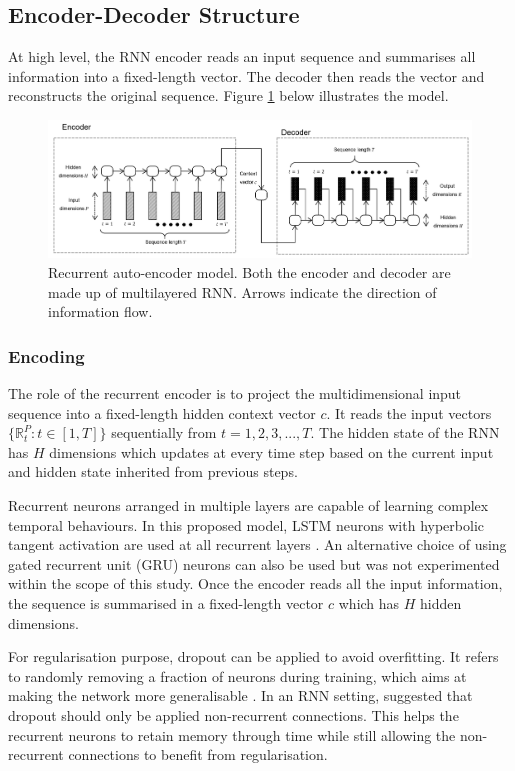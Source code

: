 \documentclass[runningheads]{llncs}
\begin{document}
\subsection{Encoder-Decoder Structure} 
At high level, the RNN encoder reads an input sequence and summarises all information into a fixed-length vector. The decoder then reads the vector and reconstructs the original sequence. Figure \ref{fig:seq2seq} below illustrates the model.

\begin{figure}[H]
	\centering
	\includegraphics[width=1\textwidth]{seq2seq.png}
	\caption{Recurrent auto-encoder model. Both the encoder and decoder are made up of multilayered RNN. Arrows indicate the direction of information flow.}
	\label{fig:seq2seq}
\end{figure}

\subsubsection{Encoding}

The role of the recurrent encoder is to project the multidimensional input sequence into a fixed-length hidden context vector \(c\). It reads the input vectors \(\{\mathbb{R}_t^P:t\in [1,T]\}\) sequentially from \(t=1,2,3,...,T\). The hidden state of the RNN has \(H\) dimensions which updates at every time step based on the current input and hidden state inherited from previous steps.

Recurrent neurons arranged in multiple layers are capable of learning complex temporal behaviours. In this proposed model, LSTM neurons with hyperbolic tangent activation are used at all recurrent layers \cite{hochreiter1997}. An alternative choice of using gated recurrent unit (GRU) neurons \cite{cho2014} can also be used but was not experimented within the scope of this study. Once the encoder reads all the input information, the sequence is summarised in a fixed-length vector \(c\) which has \(H\) hidden dimensions.

For regularisation purpose, dropout can be applied to avoid overfitting. It refers to randomly removing a fraction of neurons during training, which aims at making the network more generalisable \cite{srivastava2014}. In an RNN setting, \cite{zaremba2014} suggested that dropout should only be applied non-recurrent connections. This helps the recurrent neurons to retain memory through time while still allowing the non-recurrent connections to benefit from regularisation.
\end{document}
